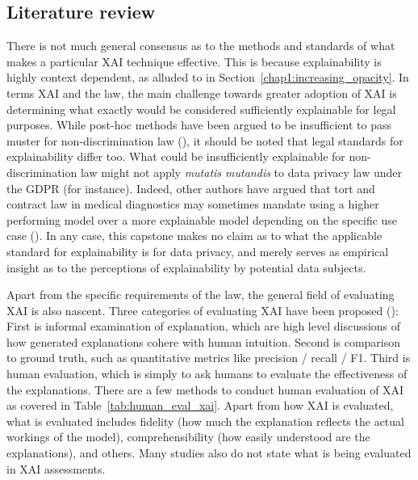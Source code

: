 \subsection{Literature review}
There is not much general consensus as to the methods and standards of what makes a particular XAI technique effective. This is because explainability is highly context dependent, as alluded to in Section~\ref{chap1:increasing_opacity}. In terms XAI and the law, the main challenge towards greater adoption of XAI is determining what exactly would be considered sufficiently explainable for legal purposes. While post-hoc methods have been argued to be insufficient to pass muster for non-discrimination law (\cite{vale2022explainable}), it should be noted that legal standards for explainability differ too. What could be insufficiently explainable for non-discrimination law might not apply \textit{mutatis mutandis} to data privacy law under the GDPR (for instance). Indeed, other authors have argued that tort and contract law in medical diagnostics may sometimes mandate using a higher performing model over a more explainable model depending on the specific use case (\cite{hacker2020explainable}). In any case, this capstone makes no claim as to what the applicable standard for explainability is for data privacy, and merely serves as empirical insight as to the perceptions of explainability by potential data subjects.

Apart from the specific requirements of the law, the general field of evaluating XAI is also nascent. Three categories of evaluating XAI have been proposed (\cite{danilevsky2020}): First is informal examination of explanation, which are high level discussions of how generated explanations cohere with human intuition. Second is comparison to ground truth, such as quantitative metrics like precision / recall / F1. Third is human evaluation, which is simply to ask humans to evaluate the effectiveness of the explanations. There are a few methods to conduct human evaluation of XAI as covered in Table~\ref{tab:human_eval_xai}. Apart from how XAI is evaluated, what is evaluated includes fidelity (how much the explanation reflects the actual workings of the model), comprehensibility (how easily understood are the explanations), and others. Many studies also do not state what is being evaluated in XAI assessments. 

